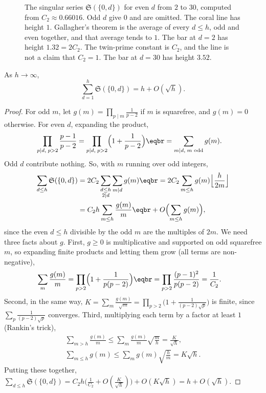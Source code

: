\begin{figure}[ht]
\centering
{}
\caption{The singular series $\mathfrak S(\{0,d\})$ for even $d$ from $2$ to $30$, computed from $C_2\approx0.66016$. Odd $d$ give $0$ and are omitted. The coral line has height $1$. Gallagher's theorem is the average of every $d\le h$, odd and even together, and that average tends to $1$. The bar at $d=2$ has height $1.32=2C_2$. The twin-prime constant is $C_2$, and the line is not a claim that $C_2=1$. The bar at $d=30$ has height $3.52$.}
\label{fig:ssbars}
\end{figure}

\begin{theorem}[Gallagher, 1976]\label{thm:gallagher}
As $h\to\infty$,
\[
\sum_{d=1}^h\mathfrak S(\{0,d\})=h+O(\sqrt h).
\]
\end{theorem}

\begin{proof}
For odd $m$, let $g(m)=\prod_{p\mid m}\frac1{p-2}$ if $m$ is squarefree, and $g(m)=0$ otherwise. For even $d$, expanding the product,
\[
\begin{aligned}\prod_{p\mid d,\;p>2}\frac{p-1}{p-2}&=\prod_{p\mid d,\;p>2}\Bigl(1+\frac1{p-2}\Bigr)\eqbr=\sum_{m\mid d,\;m\text{ odd}}g(m).\end{aligned}
\]
Odd $d$ contribute nothing. So, with $m$ running over odd integers,
\[
\begin{aligned}\sum_{d\le h}\mathfrak S(\{0,d\})&=2C_2\sum_{\substack{d\le h\\2\mid d}}\sum_{m\mid d}g(m)\eqbr=2C_2\sum_{m\le h}g(m)\Bigl\lfloor\frac h{2m}\Bigr\rfloor\\&=C_2h\sum_{m\le h}\frac{g(m)}m\eqbr+O\Bigl(\sum_{m\le h}g(m)\Bigr),\end{aligned}
\]
since the even $d\le h$ divisible by the odd $m$ are the multiples of $2m$. We need three facts about $g$. First, $g\ge0$ is multiplicative and supported on odd squarefree $m$, so expanding finite products and letting
them grow (all terms are non-negative),
\[
\begin{aligned}\sum_m\frac{g(m)}m&=\prod_{p>2}\Bigl(1+\frac1{p(p-2)}\Bigr)\eqbr=\prod_{p>2}\frac{(p-1)^2}{p(p-2)}=\frac1{C_2}.\end{aligned}
\]
Second, in the same way, $K=\sum_m\frac{g(m)}{\sqrt m}=\prod_{p>2}\bigl(1+\frac1{(p-2)\sqrt p}\bigr)$ is finite, since $\sum_p\frac1{(p-2)\sqrt p}$ converges. Third, multiplying each term by a factor at least $1$ (Rankin's trick),
\[
\begin{gathered}\sum_{m>h}\frac{g(m)}m\le\sum_m\frac{g(m)}m\sqrt{\frac mh}=\frac K{\sqrt h},\\\sum_{m\le h}g(m)\le\sum_mg(m)\sqrt{\frac hm}=K\sqrt h.\end{gathered}
\]
Putting these together, $\sum_{d\le h}\mathfrak S(\{0,d\})=C_2h\bigl(\frac1{C_2}+O(\frac K{\sqrt h})\bigr)+O(K\sqrt h)=h+O(\sqrt h)$.
\end{proof}

